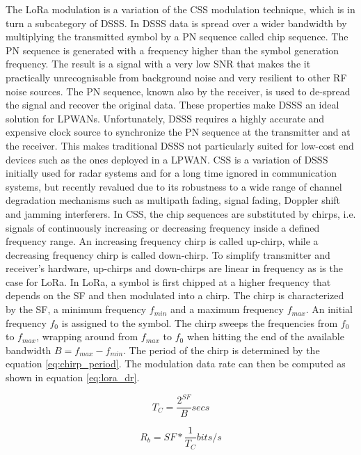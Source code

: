 The LoRa modulation is a variation of the \gls{CSS} modulation technique, which is in turn a subcategory of \gls{DSSS}. In \gls{DSSS} data is spread over a wider bandwidth by multiplying the transmitted symbol by a \gls{PN} sequence called chip sequence. The \gls{PN} sequence is generated with a frequency higher than the symbol generation frequency. The result is a signal with a very low \gls{SNR} that makes the it practically unrecognisable from background noise and very resilient to other \gls{RF} noise sources. The \gls{PN} sequence, known also by the receiver, is used to de-spread the signal and recover the original data. These properties make \gls{DSSS} an ideal solution for \glspl{LPWAN}. Unfortunately, \gls{DSSS} requires a highly accurate and expensive clock source to synchronize the \gls{PN} sequence at the transmitter and at the receiver. This makes traditional \gls{DSSS} not particularly suited for low-cost end devices such as the ones deployed in a \gls{LPWAN}.
\gls{CSS} is a variation of \gls{DSSS} initially used for radar systems and for a long time ignored in communication systems, but recently revalued due to its robustness to a wide range of channel degradation mechanisms such as multipath fading, signal fading, Doppler shift and jamming interferers.
In \gls{CSS}, the chip sequences are substituted by chirps, i.e. signals of continuously increasing or decreasing frequency inside a defined frequency range. An increasing frequency chirp is called up-chirp, while a decreasing frequency chirp is called down-chirp. To simplify transmitter and receiver's hardware, up-chirps and down-chirps are linear in frequency as is the case for LoRa.
In LoRa, a symbol is first chipped at a higher frequency that depends on the \gls{SF} and then modulated into a chirp. The chirp is characterized by the \gls{SF}, a minimum frequency $f_{min}$ and a maximum frequency $f_{max}$. An initial frequency $f_0$ is assigned to the symbol. The chirp sweeps the frequencies from $f_0$ to $f_{max}$, wrapping around from $f_{max}$ to $f_0$ when hitting the end of the available bandwidth $B = f_{max} - f_{min}$. The period of the chirp is determined by the equation \ref{eq:chirp_period}. The modulation data rate can then be computed as shown in equation \ref{eq:lora_dr}.

\begin{equation}
\label{eq:chirp_period}
T_C = \frac{2^{SF}}{B} secs
\end{equation}

\begin{equation}
\label{eq:lora_dr}
R_b = SF*\frac{1}{T_C} bits/s
\end{equation}

